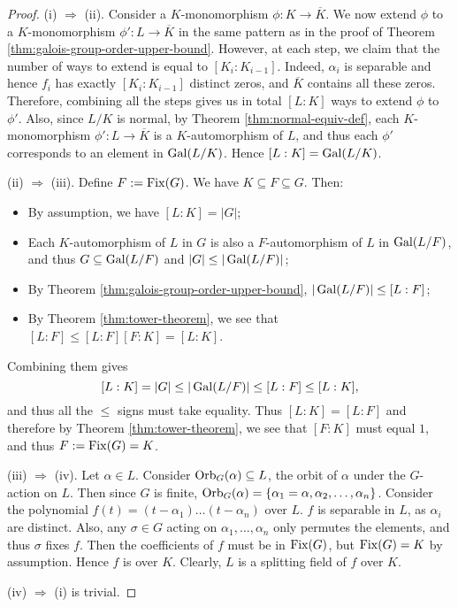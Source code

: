 \begin{proof}
	
	
	
	(i) $\Rightarrow$ (ii). Consider a $K$-monomorphism $\phi: K \to \overline{K}$. We now extend $\phi$ to a $K$-monomorphism $\phi':L \to \overline{K}$ in the same pattern as in the proof of Theorem \ref{thm:galois-group-order-upper-bound}. However, at each step, we claim that the number of ways to extend is equal to $[K_i : K_{i-1}]$. Indeed, $\alpha_i$ is separable and hence $f_i$ has exactly $[K_i : K_{i-1}]$ distinct zeros, and $\overline K$ contains all these zeros. Therefore, combining all the steps gives us in total $[L:K]$ ways to extend $\phi$ to $\phi'$. Also, since $L/K$ is normal, by Theorem \ref{thm:normal-equiv-def}, each $K$-monomorphism $\phi': L \to \overline{K}$ is a $K$-automorphism of $L$, and thus each $\phi'$ corresponds to an element in $\operatorname{Gal}(L/K)$. Hence $[L:K] = \operatorname{Gal}(L/K)$. 
	
	(ii) $\Rightarrow$ (iii). Define $F:= \operatorname{Fix}(G)$. We have $K \subseteq F \subseteq G$. Then:
	\begin{itemize}
		\item By assumption, we have $[L:K] = |G|$;
		\item     Each $K$-automorphism of $L$ in $G$ is also a $F$-automorphism of $L$ in $\operatorname{Gal}(L/F)$, and thus $G \subseteq \operatorname{Gal}(L / F)$ and $|G| \le |\operatorname{Gal}(L / F)|$;
		\item  By Theorem \ref{thm:galois-group-order-upper-bound}, $|\operatorname{Gal}(L/F)| \le [L:F]$;
		
		\item     By Theorem \ref{thm:tower-theorem}, we see that $ [L:F] \le [L:F][F:K] = [L:K]$.
	\end{itemize}
	
	Combining them gives $$
	[L:K] = |G| \le |\operatorname{Gal}(L/F)| \le  [L:F] \le [L:K],
	$$    
	and thus all the $\le$ signs must take equality.  
	Thus $[L:K]=[L:F]$ and therefore by Theorem \ref{thm:tower-theorem}, we see that $[F:K]$ must equal $1$, and thus $F:=\operatorname{Fix}(G) = K$.
	
	(iii) $\Rightarrow$ (iv). Let $\alpha \in L$. Consider $\operatorname{Orb}_G(\alpha) \subseteq L$, the orbit of $\alpha$ under the $G$-action on $L$. Then since $G$ is finite, $\operatorname{Orb}_G(\alpha) = \{ \alpha_1 = \alpha, \alpha_2, \ldots, \alpha_n\}$. Consider the polynomial $f(t) = (t-\alpha_1) \ldots (t-\alpha_n)$ over $L$.  $f$ is separable in $L$, as $\alpha_i$ are distinct. Also, any $\sigma \in G$ acting on $\alpha_1, \dots, \alpha_n$ only permutes the elements, and thus $\sigma$ fixes $f$. Then the coefficients of $f$ must be in $\operatorname{Fix}(G)$, but $\operatorname{Fix}(G) = K$ by assumption. Hence $f$ is over $K$. Clearly, $L$ is a splitting field of $f$ over $K$. 
	
	(iv) $\Rightarrow$ (i) is trivial.
	
\end{proof}

